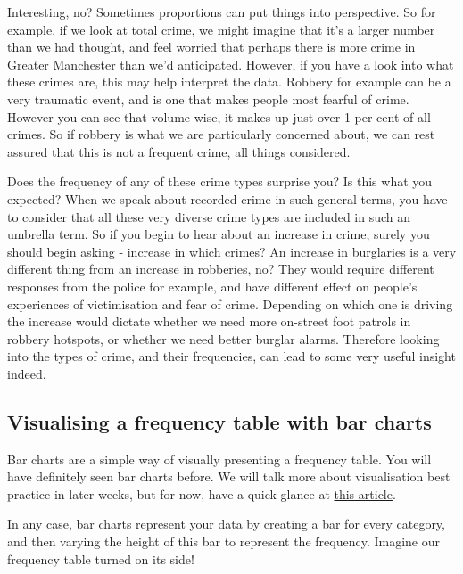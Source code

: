 \documentclass[
]{book}
\begin{document}
Interesting, no? Sometimes proportions can put things into perspective. So for example, if we look at total crime, we might imagine that it's a larger number than we had thought, and feel worried that perhaps there is more crime in Greater Manchester than we'd anticipated. However, if you have a look into what these crimes are, this may help interpret the data. Robbery for example can be a very traumatic event, and is one that makes people most fearful of crime. However you can see that volume-wise, it makes up just over 1 per cent of all crimes. So if robbery is what we are particularly concerned about, we can rest assured that this is not a frequent crime, all things considered.

Does the frequency of any of these crime types surprise you? Is this what you expected? When we speak about recorded crime in such general terms, you have to consider that all these very diverse crime types are included in such an umbrella term. So if you begin to hear about an increase in crime, surely you should begin asking - increase in which crimes? An increase in burglaries is a very different thing from an increase in robberies, no? They would require different responses from the police for example, and have different effect on people's experiences of victimisation and fear of crime. Depending on which one is driving the increase would dictate whether we need more on-street foot patrols in robbery hotspots, or whether we need better burglar alarms. Therefore looking into the types of crime, and their frequencies, can lead to some very useful insight indeed.

\hypertarget{visualising-a-frequency-table-with-bar-charts}{%
\subsection{Visualising a frequency table with bar charts}\label{visualising-a-frequency-table-with-bar-charts}}

Bar charts are a simple way of visually presenting a frequency table. You will have definitely seen bar charts before. We will talk more about visualisation best practice in later weeks, but for now, have a quick glance at \href{https://flowingdata.com/2015/08/31/bar-chart-baselines-start-at-zero/}{this article}.

In any case, bar charts represent your data by creating a bar for every category, and then varying the height of this bar to represent the frequency. Imagine our frequency table turned on its side!
\end{document}
